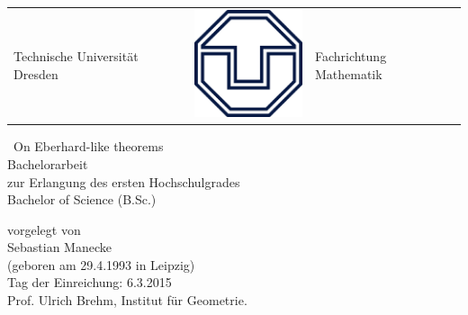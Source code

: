 \begin{titlepage}
\begin{center}


  \begin{tabular}{R{6.9cm} M p{6.9cm}}
    {\Large Technische Universität Dresden}&  \includegraphics[scale =0.25]{TU.png} & \Large{Fachrichtung Mathematik}     
  \end{tabular}

  \vfil

  {\Huge\ On Eberhard-like theorems}
  \\[\bigskipamount]
  \vfil
      {\LARGE
        Bachelorarbeit
        \\[\bigskipamount]
        zur Erlangung des ersten Hochschulgrades
        \\[\bigskipamount]
        Bachelor of Science  (B.Sc.)
        \\[\bigskipamount]
      }




      vorgelegt von
      \\[\bigskipamount]
      Sebastian Manecke
      \\[\bigskipamount]
      (geboren am 29.4.1993 in Leipzig)
      \\[\bigskipamount]
      Tag der Einreichung: 6.3.2015
      \\[\bigskipamount]
      Prof. Ulrich Brehm, Institut für Geometrie.
\end{center}
\end{titlepage}

